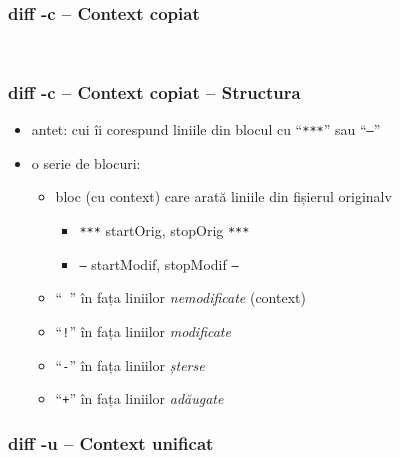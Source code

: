\documentclass{beamer}
\begin{document}
\begin{frame}
  \frametitle{\textbf{diff -c} – Context copiat}
  \footnotesize \tt 
\end{frame}

\begin{frame}
  \frametitle{\textbf{diff -c} – Context copiat – Structura}
  \begin{itemize}
    \item antet: cui îi corespund liniile din blocul cu ``\texttt{\texttt{***}}'' sau ``\texttt{---}''
    \item o serie de blocuri:
      \begin{itemize}
        \item bloc (cu context) care arată liniile din fișierul originalv
          \begin{itemize} 
          \item \texttt{***} startOrig, stopOrig \texttt{***}
          \item \texttt{---} startModif, stopModif \texttt{---}
          \end{itemize}
        \item ``\texttt{ }'' în fața liniilor \textit{nemodificate} (context)
        \item ``\texttt{!}'' în fața liniilor \textit{modificate}
        \item ``\texttt{-}'' în fața liniilor \textit{șterse}
        \item ``\texttt{+}'' în fața liniilor \textit{adăugate}
      \end{itemize}
  \end{itemize}
\end{frame}

\begin{frame}
  \frametitle{\textbf{diff -u} – Context unificat}
  \tt{}
\end{frame}
\end{document}
